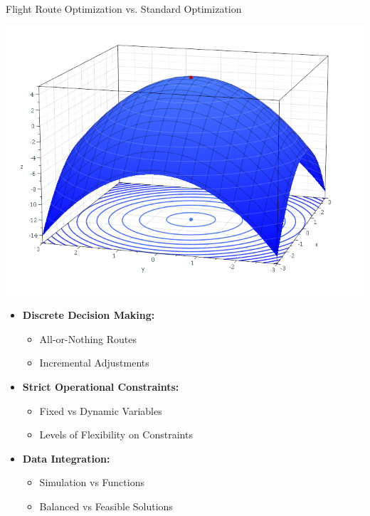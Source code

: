 \documentclass[aspectratio=169,xcolor=dvipsnames]{beamer}
\begin{document}
\begin{frame}{Flight Route Optimization vs. Standard Optimization}
    \begin{minipage}{0.45\textwidth}
        \centering
        \includegraphics[width=\textwidth]{images/MaximumParaboloid.png}
    \end{minipage}
    \hfill
    \begin{minipage}{0.5\textwidth}
        \begin{itemize}
            \item \textbf{Discrete Decision Making:}
            \begin{itemize}
                \item All-or-Nothing Routes
                \item Incremental Adjustments
            \end{itemize}
            
            \item \textbf{Strict Operational Constraints:}
            \begin{itemize}
                \item Fixed vs Dynamic Variables
                \item Levels of Flexibility on Constraints
            \end{itemize}
            
            \item \textbf{Data Integration:}
            \begin{itemize}
                \item Simulation vs Functions
                \item Balanced vs Feasible Solutions
            \end{itemize}
        \end{itemize}
    \end{minipage}
\end{frame}
\end{document}
